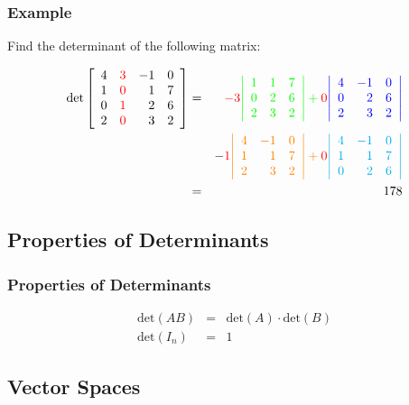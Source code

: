 \begin{frame}
  \frametitle{Example}

  Find the determinant of the following matrix:

  \begin{eqnarray*}
    \mathrm{det}
    \left[ \begin{array}{rrrr}
    4 & {\color{red}3} & -1 & 0 \\ 
    1 & {\color{red}0} & 1 & 7 \\ 
    0 & {\color{red}1} & 2 & 6 \\ 
    2 & {\color{red}0} & 3 & 2 \\ 
    \end{array} \right]
    & = & 
    {\color{red}-3} \color{green}{ \left| \begin{array}{rrr} 1 & 1 & 7 \\ 0 & 2 & 6 \\ 2 & 3 & 2 \end{array} \right| }
    + {\color{red}0} \color{blue}{ \left| \begin{array}{rrr} 4 & -1 & 0 \\ 0 & 2 & 6 \\ 2 & 3 & 2 \end{array} \right| } \\
    & & 
    - {\color{red}1} \color{orange}{ \left| \begin{array}{rrr} 4 & -1 & 0 \\ 1 & 1 & 7 \\ 2 & 3 & 2 \end{array} \right| }
    + {\color{red}0} \color{cyan}{ \left| \begin{array}{rrr} 4 & -1 & 0 \\ 1 & 1 & 7 \\ 0 & 2 & 6 \end{array} \right| } \\
    & = & 178
  \end{eqnarray*}


\end{frame}

\subsection{Properties of Determinants}

\begin{frame}
  \frametitle{Properties of Determinants}

  \begin{eqnarray*}
    \mathrm{det}(AB) & = & \mathrm{det}(A) \cdot \mathrm{det}(B) \\
    \mathrm{det}(I_n) & = & 1
  \end{eqnarray*}



\end{frame}


\subsection{Vector Spaces}

